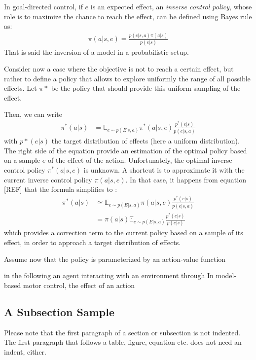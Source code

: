 \documentclass[runningheads]{llncs}
\begin{document}
In goal-directed control, if $e$ is an expected effect, an \emph{inverse control policy}, whose role is to maximize the chance to reach the effect, can be defined using Bayes rule as:
\begin{align}
\pi(a|s,e) = \frac{p(e|s,a)\pi(a|s)}{p(e|s)}
\end{align}
That is said the inversion of a model in a probabilistic setup. 

Consider now a case where the objective is not to reach a certain effect, but rather to define a policy that allows to explore uniformly the range of all possible effects. Let $\pi*$ be the policy that should provide this uniform sampling of the effect. 

Then, we can write 
\begin{align}
\pi^*(a|s) &= \mathbb{E}_{e\sim p(E|s,a)} \pi^*(a|s,e)\frac{p^*(e|s)}{p(e|s,a)}
\end{align}
with $p*(e|s)$ the target distribution of effects (here a uniform distribution).
The right side of the equation provide an estimation of the optimal policy based on a sample $e$ of the effect of the action. Unfortunately, the optimal inverse control policy $\pi^*(a|s,e)$ is unknown. A shortcut is to approximate it with the current inverse control policy $\pi(a|s,e)$.
In that case, it happens from equation [REF] that the formula simplifies to :
\begin{align}
\pi^*(a|s) &\simeq \mathbb{E}_{e\sim p(E|s,a)} \pi(a|s,e)\frac{p^*(e|s)}{p(e|s,a)}\\
&= \pi(a|s) \mathbb{E}_{e\sim p(E|s,a)} \frac{p^*(e|s)}{p(e|s)}
\end{align}
which provides a correction term to the current policy based on a sample of its effect, in order to approach a target distribution of effects.



Assume now that the policy is parameterized by an action-value function  


   

 in the following an agent interacting with an environment through 
In model-based motor control, the effect of an action 

\subsection{A Subsection Sample}
Please note that the first paragraph of a section or subsection is
not indented. The first paragraph that follows a table, figure,
equation etc. does not need an indent, either.
\end{document}
